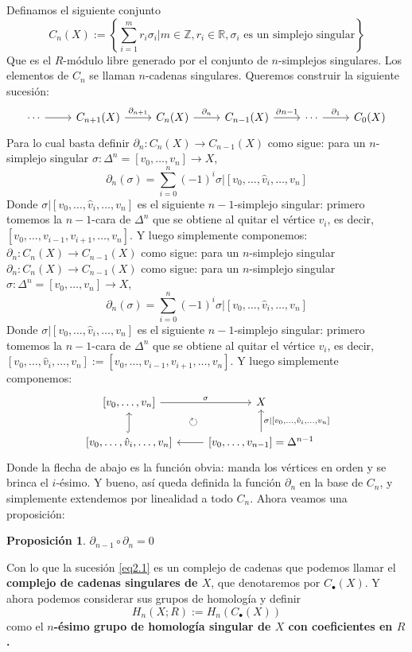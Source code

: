 \documentclass[spanish]{book}
\theoremstyle{definition}
\newtheorem*{prop}{Proposición}
\newcommand{\R}{\mathbb{R}}
\newcommand{\Z}{\mathbb{Z}}
\begin{document}
	Definamos el siguiente conjunto 
	\[C_n(X):=\left\{\sum_{i=1}^mr_i\sigma_i|m\in\Z,r_i\in\R,\sigma_i\text{ es un simplejo singular}\right\}\]
	Que es el $R$-módulo libre generado por el conjunto de $n$-simplejos singulares. Los elementos de $C_n$ se llaman $n$-cadenas singulares. Queremos construir la siguiente sucesión:
	\begin{equation}\label{eq2.1}\begin{tikzcd}
		\cdots\arrow{r}&C_{n+1}(X)\arrow{r}{\partial_{n+1}}&C_n(X)\arrow{r}{\partial_n}&C_{n-1}(X)\arrow{r}{\partial{n-1}}&\cdots\arrow{r}{\partial_1}&C_0(X)
	\end{tikzcd}\end{equation}
	Para lo cual basta definir
	$\partial_n:C_n(X)\to C_{n-1}(X)$ como sigue: para un $n$-simplejo singular $\sigma:\Delta^n=[v_0,\ldots,v_n]\to X$,
	\[\partial_n(\sigma)=\sum_{i=0}^n(-1)^i\sigma|[v_0,\ldots,\hat{v}_i,\ldots,v_n]\]
	Donde $\sigma|[v_0,\ldots,\hat{v}_i,\ldots,v_n]$ es el siguiente $n-1$-simplejo singular: primero tomemos la $n-1$-cara de $\Delta^n$ que se obtiene al quitar el vértice $v_i$, es decir, $[v_0,\ldots,v_{i-1},v_{i+1},\ldots,v_n]$. Y luego simplemente componemos:
	$\partial_n:C_n(X)\to C_{n-1}(X)$ como sigue: para un $n$-simplejo singular $\partial_n:C_n(X)\to C_{n-1}(X)$ como sigue: para un $n$-simplejo singular $\sigma:\Delta^n=[v_0,\ldots,v_n]\to X$,
	\[\partial_n(\sigma)=\sum_{i=0}^n(-1)^i\sigma|[v_0,\ldots,\hat{v}_i,\ldots,v_n]\]
	Donde $\sigma|[v_0,\ldots,\hat{v}_i,\ldots,v_n]$ es el siguiente $n-1$-simplejo singular: primero tomemos la $n-1$-cara de $\Delta^n$ que se obtiene al quitar el vértice $v_i$, es decir, $[v_0,\ldots,\hat{v}_i,\ldots,v_n]:= [v_0,\ldots,v_{i-1},v_{i+1},\ldots,v_n]$. Y luego simplemente componemos:
	\[
	\begin{tikzcd}
		{[v_0,\ldots,v_n]} \arrow{r}{\sigma} & X \\
		{[v_0,\ldots,\hat{v}_i,\ldots,v_n]}\arrow[u,hook]&{[v_0,\ldots,v_{n-1}]}=\Delta^{n-1}\arrow{l}\arrow{u}[swap]{\sigma|[v_0,\ldots,\hat{v}_i,\ldots,v_n]}
		\arrow[from=1-1, to=2-2, phantom, "\circlearrowright"]
	\end{tikzcd}
	\]
	Donde la flecha de abajo es la función obvia: manda los vértices en orden y se brinca el $i$-ésimo. Y bueno, así queda definida la función $\partial_n$ en la base de $C_n$, y simplemente extendemos por linealidad a todo $C_n$. Ahora veamos una proposición:
	\begin{prop}
		$\partial_{n-1}\circ\partial_n=0$
	\end{prop}
	Con lo que la sucesión \eqref{eq2.1} es un complejo de cadenas que podemos llamar el \textbf{complejo de cadenas singulares de $X$}, que denotaremos por $C_\bullet(X)$. Y ahora podemos considerar sus grupos de homología y definir \[H_n(X;R):=H_n(C_\bullet(X))\] como el \textbf{$n$-ésimo grupo de homología singular de $X$ con coeficientes en $R$.}
\end{document}
